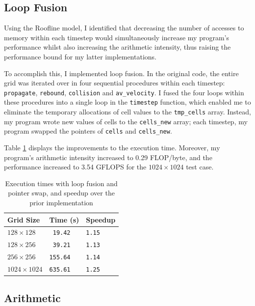 \documentclass[twocolumn, a4paper]{article}
\begin{document}
\subsection{Loop Fusion}

Using the Roofline model, I identified that decreasing the number of accesses to memory within each timestep would simultaneously increase my program's performance whilst also increasing the arithmetic intensity, thus raising the performance bound for my latter implementations. 

To accomplish this, I implemented loop fusion.
In the original code, the entire grid was iterated over in four sequential procedures within each timestep: \texttt{propagate}, \texttt{rebound}, \texttt{collision} and \texttt{av\_velocity}.
I fused the four loops within these procedures into a single loop in the \texttt{timestep} function, which enabled me to eliminate the temporary allocations of cell values to the \texttt{tmp\_cells} array.
Instead, my program wrote new values of cells to the \texttt{cells\_new} array; each timestep, my program swapped the pointers of \texttt{cells} and \texttt{cells\_new}.

Table \ref{tab:loop_fusion_pointer_swap} displays the improvements to the execution time.
Moreover, my program's arithmetic intensity increased to 0.29 FLOP/byte, and the performance increased to 3.54 GFLOPS for the $1024 \times 1024$ test case.

\begin{table}[htbp]
  \begin{center}
  \caption{Execution times with loop fusion and pointer swap, and speedup over the prior implementation}\label{tab:loop_fusion_pointer_swap}
  \begin{tabular}[t]{l | l l} 
      \hline\hline
      Grid Size&Time (s)&Speedup\\
      \hline
      $128 \times 128$&\texttt{ 19.42}&\texttt{1.15}\\
      $128 \times 256$&\texttt{ 39.21}&\texttt{1.13}\\
      $256 \times 256$&\texttt{155.64}&\texttt{1.14}\\
      $1024 \times 1024$&\texttt{635.61}&\texttt{1.25}\\
      \hline
    \end{tabular}
  \end{center}
\end{table}

\subsection{Arithmetic}
\end{document}
